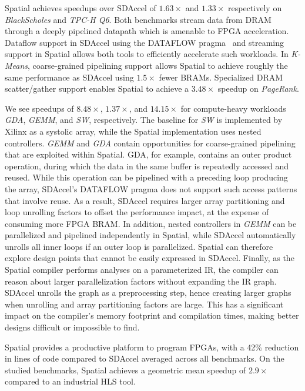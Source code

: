 Spatial achieves speedups over SDAccel of $1.63\times$ and $1.33\times$ respectively on \emph{BlackScholes} and \emph{TPC-H Q6}. Both benchmarks
stream data from DRAM through a deeply pipelined datapath which is amenable to FPGA acceleration. Dataflow support in SDAccel using the DATAFLOW pragma~\cite{dataflowRef} and streaming support in Spatial allows both tools to efficiently accelerate such workloads. In \emph{K-Means}, coarse-grained pipelining support allows Spatial to achieve roughly the same performance as SDAccel using $1.5\times$ fewer BRAMs.
Specialized DRAM scatter/gather support enables Spatial to achieve a $3.48\times$ speedup on \emph{PageRank}.

We see speedups of $8.48\times$, $1.37\times$, and $14.15\times$ for compute-heavy workloads \emph{GDA}, \emph{GEMM}, and \emph{SW}, respectively. The baseline for \emph{SW} is implemented by Xilinx as a systolic array, while the Spatial implementation uses nested controllers. \emph{GEMM} and \emph{GDA} contain opportunities for coarse-grained pipelining that are exploited within Spatial.
GDA, for example, contains an outer product operation, during which the data in the same buffer is repeatedly accessed and reused. While this operation can be pipelined with a preceding loop producing the array, SDAccel's DATAFLOW pragma does not support such access patterns that involve reuse. As a result, SDAccel requires larger array partitioning and loop unrolling factors to offset the performance impact, at the expense of consuming more FPGA BRAM.
In addition, nested controllers in \emph{GEMM}
can be parallelized and pipelined independently in Spatial, while SDAccel automatically unrolls all inner loops if an outer loop is parallelized. Spatial can therefore explore
design points that cannot be easily expressed in SDAccel. Finally, as the Spatial compiler performs analyses on a parameterized IR, the compiler can reason about larger parallelization factors without expanding the IR graph.
SDAccel unrolls the graph as a preprocessing step, hence creating larger graphs when unrolling and array partitioning factors are large.
This has a significant impact on the compiler's memory footprint and compilation times, making better designs difficult or impossible to find.

Spatial provides a productive platform to program FPGAs, with a 42\% reduction in lines of code compared to SDAccel averaged across all benchmarks. On the studied benchmarks, Spatial achieves a geometric mean speedup of $2.9\times$ compared to an industrial HLS tool.


